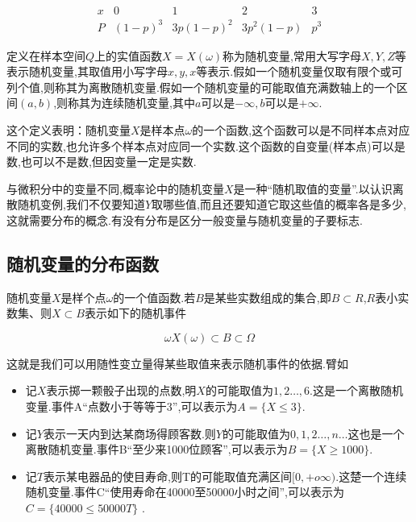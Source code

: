 \[ 
\begin{array}{c|cccc}{x} & {0} & {1} & {2} & {3} \\ \hline P & {(1-p)^{3}} & {3 p(1-p)^{2}} & {3 p^{2}(1-p)} & {p^{3}}\end{array}
\]

\begin{definition}{}{}
	定义在样本空间$ Q $上的实值函数$ X=X(\omega) $称为随机变量,常用大写字母$ X,Y,Z $等表示随机变量,其取值用小写字母$ x,y,x $等表示.假如一个随机变量仅取有限个或可列个值,则称其为离散随机变量.假如一个随机变量的可能取值充满数轴上的一个区间$ (a,b) $,则称其为连续随机变量,其中$ a $可以是$ -\infty ,b $可以是$ +\infty $.
\end{definition}


这个定义表明：随机变量$ X $是样本点$ \omega $的一个函数,这个函数可以是不同样本点对应不同的实数,也允许多个样本点对应同一个实数.这个函数的自变量(样本点)可以是数,也可以不是数,但因变量一定是实数.

与微积分中的变量不同,概率论中的随机变量$ X $是一种“随机取值的变量”.以认识离散随机变例,我们不仅要知道$ Y $取哪些值,而且还要知道它取这些值的概率各是多少,这就需要分布的概念.有没有分布是区分一般变量与随机变量的子要标志.

\subsection{随机变量的分布函数}

随机变量$ X $是样个点$ \omega $的一个值函数.若$ B $是某些实数组成的集合,即$ B\subset R $,$ R $表小实数集、则$ X\subset B $表示如下的随机事件

\[
\omega X(\omega)\subset B \subset \Omega
\]

这就是我们可以用随性变立量得某些取值来表示随机事件的依据.臂如

\begin{itemize}
	\item 记$ X $表示掷一颗骰子出现的点数,明$ X $的可能取值为$ 1,2\dotsc ,6 $.这是一个离散随机变量.事件A“点数小于等等于3”,可以表示为$ A=\{X\leq 3\} $.
	\item 记$ Y $表示一天内到达某商场得顾客数.则$ Y $的可能取值为$ 0,1,2\dotsc ,n\dotsc $这也是一个离散随机变量.事件B“至少来1000位顾客”,可以表示为$ B=\{ X\geq 1000 \} $.
	\item 记$ T $表示某电器品的使目寿命,则T的可能取值充满区间$ [0,+o\infty ) $.这楚一个连续随机变量.事件C“使用寿命在40000至50000小时之间”,可以表示为$ C=\{ 40000 \leq 50000 T\} $ . 
\end{itemize}



